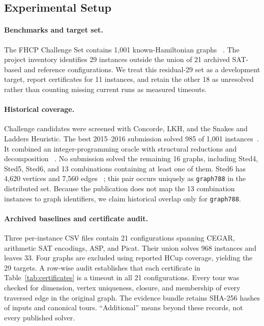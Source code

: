 \documentclass[sigconf,anonymous]{aamas}
\begin{document}
\subsection{Experimental Setup}
\label{sec:setup}

\paragraph{Benchmarks and target set.}
The FHCP Challenge Set contains 1,001 known-Hamiltonian graphs
~\cite{haythorpe2018fhcp}. The project inventory identifies 29 instances
outside the union of 21 archived SAT-based and reference configurations.
We treat this residual-29 set as a development target, report
certificates for 11 instances, and retain the other 18 as unresolved
rather than counting missing current runs as measured timeouts.

\paragraph{Historical coverage.}
Challenge candidates were screened with Concorde, LKH, and the Snakes
and Ladders Heuristic. The best 2015--2016 submission solved 985 of 1,001
instances~\cite{haythorpe2018fhcp}. It combined an integer-programming
oracle with structural reductions and decomposition
~\cite{coudert2017defi}. No submission solved the remaining 16 graphs,
including Sted4, Sted5, Sted6, and 13 combinations containing at least
one of them. Sted6 has 4,620 vertices and 7,560 edges
~\cite{haythorpe2019change}; this pair occurs uniquely as
\texttt{graph788} in the distributed set. Because the publication does
not map the 13 combination instances to graph identifiers, we claim
historical overlap only for \texttt{graph788}.

\paragraph{Archived baselines and certificate audit.}
Three per-instance CSV files contain 21 configurations spanning CEGAR,
arithmetic SAT encodings, ASP, and Picat. Their union solves 968
instances and leaves 33. Four graphs are excluded using reported HCup
coverage, yielding the 29 targets. A row-wise audit establishes that each
certificate in Table~\ref{tab:certificates} is a timeout in all 21
configurations. Every tour was checked for dimension, vertex uniqueness,
closure, and membership of every traversed edge in the original graph.
The evidence bundle retains SHA-256 hashes of inputs and canonical tours.
``Additional'' means beyond these records, not every published solver.
\end{document}
